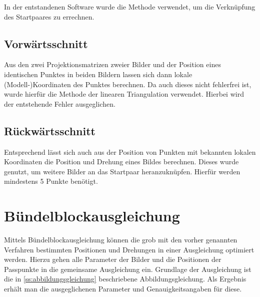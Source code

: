 \documentclass[./00PhotoBox.tex]{subfiles}
\begin{document}
In der entstandenen Software wurde die Methode verwendet, um die Verknüpfung des Startpaares zu errechnen.

\subsection{Vorwärtsschnitt}
Aus den zwei Projektionsmatrizen zweier Bilder und der Position eines identischen Punktes in beiden Bildern lassen sich dann lokale (Modell-)Koordinaten des Punktes berechnen. Da auch dieses nicht fehlerfrei ist, wurde hierfür die Methode der linearen Triangulation verwendet. Hierbei wird der entstehende Fehler ausgeglichen. \citep[S.312]{hartley}

\subsection{Rückwärtsschnitt}
Entsprechend lässt sich auch aus der Position von Punkten mit bekannten lokalen Koordinaten die Position und Drehung eines Bildes berechnen. Dieses wurde genutzt, um weitere Bilder an das Startpaar heranzuknüpfen. Hierfür werden mindestens 5 Punkte benötigt. \citep[S. 533ff]{hartley}


\section{Bündelblockausgleichung}
Mittels Bündelblockausgleichung können die grob mit den vorher genannten Verfahren bestimmten Positionen und Drehungen in einer Ausgleichung optimiert werden. Hierzu gehen alle Parameter der Bilder und die Positionen der Passpunkte in die gemeinsame Ausgleichung ein. Grundlage der Ausgleichung ist die in \autoref{ss:abbildungsgleichung} beschriebene Abbildungsgleichung. Als Ergebnis erhält man die ausgeglichenen Parameter und Genauigkeitsangaben für diese. \citep[S. 340]{luhmann4}

\biblio
\end{document}
